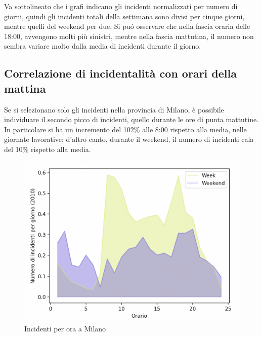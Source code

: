\documentclass[a4paper]{report}
\begin{document}
%


Va sottolineato che i grafi indicano gli incidenti normalizzati per numero di 
giorni, 
quindi gli incidenti totali della settimana sono divisi per cinque giorni, 
mentre quelli del weekend per due.
Si pu\'o osservare che nella fascia oraria delle 18:00, 
avvengono molti più sinistri, mentre nella fascia mattutina, 
il numero non sembra variare molto dalla media di incidenti durante il giorno.

\subsection{Correlazione di incidentalità con orari della mattina}

Se si selezionano solo gli incidenti nella provincia di Milano, è possibile individuare 
il secondo picco di incidenti, quello durante le ore di punta mattutine.
In particolare si ha un incremento del 102\% alle 8:00 rispetto alla media, nelle 
giornate lavorative;
d'altro canto, durante il weekend, il numero di incidenti cala del 10\% rispetto alla media.


\begin{figure}
    \includegraphics[width=\linewidth]{../src/incidenti/incidenti_senza_coords/ore_punta/week_weekend_milano.png}
    \caption{Incidenti per ora a Milano}
    \label{fig:week_weekend_milano}
\end{figure}
\end{document}
